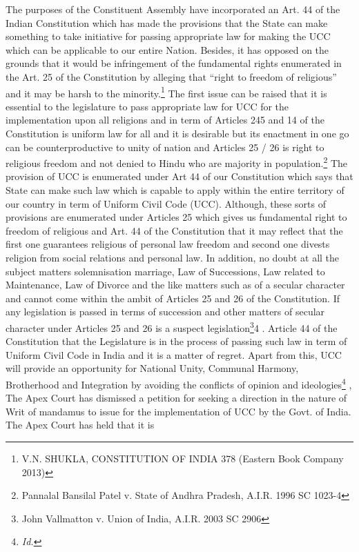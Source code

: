 \begin{multicols}{2}
\noi
The purposes of the Constituent Assembly have incorporated an Art. 44 of the Indian
Constitution which has made the provisions that the State can make something to take
initiative for passing appropriate law for making the UCC which can be applicable to our
entire Nation. Besides, it has opposed on the grounds that it would be infringement of the
fundamental rights enumerated in the Art. 25 of the Constitution by alleging that “right to
freedom of religious” and it may be harsh to the minority.\footnote{V.N. SHUKLA, CONSTITUTION OF INDIA 378 (Eastern Book Company 2013)}
The first issue can be raised that it
is essential to the legislature to pass appropriate law for UCC for the implementation upon all
religions and in term of Articles 245 and 14 of the Constitution is uniform law for all and it is
desirable but its enactment in one go can be counterproductive to unity of nation and Articles
25 / 26 is right to religious freedom and not denied to Hindu who are majority in population.\footnote{Pannalal Bansilal Patel v. State of Andhra Pradesh, A.I.R. 1996 SC 1023-4}
The provision of UCC is enumerated under Art 44 of our Constitution which says that State
can make such law which is capable to apply within the entire territory of our country in term
of Uniform Civil Code (UCC). Although, these sorts of provisions are enumerated under
Articles 25 which gives us fundamental right to freedom of religious and Art. 44 of the
Constitution that it may reflect that the first one guarantees religious of personal law freedom
and second one divests religion from social relations and personal law. In addition, no doubt
at all the subject matters solemnisation marriage, Law of Successions, Law related to
Maintenance, Law of Divorce and the like matters such as of a secular character and cannot
come within the ambit of Articles 25 and 26 of the Constitution. If any legislation is passed in terms of succession and other matters of secular character under Articles 25 and 26 is a
suspect legislation\footnote{John Vallmatton v. Union of India, A.I.R. 2003 SC 2906}4
. Article 44 of the Constitution that the Legislature is in the process of
passing such law in term of Uniform Civil Code in India and it is a matter of regret. Apart
from this, UCC will provide an opportunity for National Unity, Communal Harmony,
Brotherhood and Integration by avoiding the conflicts of opinion and ideologies\footnote{
\it Id.}
, The Apex
Court has dismissed a petition for seeking a direction in the nature of Writ of mandamus to
issue for the implementation of UCC by the Govt. of India. The Apex Court has held that it is

\end{multicols}
